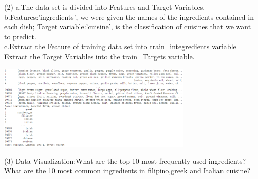 (2) a.The data set is divided into Features and Target Variables.\\
 b.Features:'ingredients', we were given the names of the ingredients contained in each dish;
Target variable:'cuisine', is the classification of cuisines that we want to predict.\\
c.Extract the Feature of training data set into train_integredients variable
      Extract the Target Variables into the train_Targets variable.
\begin{center}
  \begin{minipage}{1\linewidth}
  \centering
  \includegraphics[width=0.7\textwidth]{pic01/b.eps}
\end{minipage}

  \hfill
\end{center}
(3) Data  Visualization:What are the top 10 most frequently used ingredients?\\ What are the 10 most common ingredients in filipino,greek and Italian cuisine?

